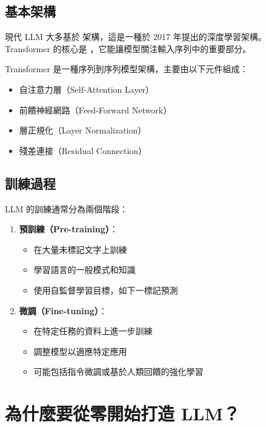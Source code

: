 \subsection{基本架構}

現代 LLM 大多基於  架構，這是一種於 2017 年提出的深度學習架構。Transformer 的核心是 ，它能讓模型關注輸入序列中的重要部分。

\begin{definition}[Transformer 架構]
Transformer 是一種序列到序列模型架構，主要由以下元件組成：
\begin{itemize}
    \item 自注意力層（Self-Attention Layer）
    \item 前饋神經網路（Feed-Forward Network）
    \item 層正規化（Layer Normalization）
    \item 殘差連接（Residual Connection）
\end{itemize}
\end{definition}

\subsection{訓練過程}

LLM 的訓練通常分為兩個階段：

\begin{enumerate}
    \item \textbf{預訓練（Pre-training）}：
    \begin{itemize}
        \item 在大量未標記文字上訓練
        \item 學習語言的一般模式和知識
        \item 使用自監督學習目標，如下一標記預測
    \end{itemize}

    \item \textbf{微調（Fine-tuning）}：
    \begin{itemize}
        \item 在特定任務的資料上進一步訓練
        \item 調整模型以適應特定應用
        \item 可能包括指令微調或基於人類回饋的強化學習
    \end{itemize}
\end{enumerate}

\section{為什麼要從零開始打造 LLM？}

